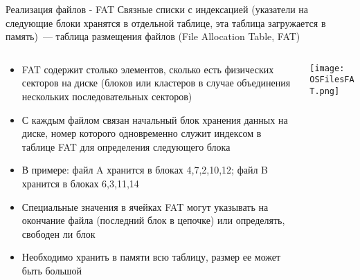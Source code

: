 \documentclass[aspectratio=169,14pt]{beamer}
\begin{document}
\begin{frame}{Реализация файлов - FAT}
    \footnotesize{Связные списки с индексацией (указатели на следующие блоки
    хранятся в отдельной таблице, эта таблица загружается в
    память)~--- таблица размещения файлов (File Allocation Table, FAT)}
    \begin{columns}
        \begin{column}{0.6\textwidth}
            \begin{spacing}{0.8}
            \begin{tiny}
                \begin{itemize}
                        \item FAT содержит столько элементов, сколько есть
                        физических секторов на диске (блоков или кластеров
                        в случае объединения нескольких последовательных секторов)
                        \item С каждым файлом связан начальный блок хранения
                        данных на диске, номер которого одновременно служит
                        индексом в таблице FAT для определения следующего блока
                        \item В примере: файл A хранится в блоках 4,7,2,10,12;
                        файл B хранится в блоках 6,3,11,14
                        \item Специальные значения в ячейках FAT могут указывать
                        на окончание файла (последний блок в цепочке) или
                        определять, свободен ли блок
                        \item Необходимо хранить в памяти всю таблицу,
                        размер ее может быть большой
                \end{itemize}
            \end{tiny}
            \end{spacing}
        \end{column}
        \begin{column}{0.4\textwidth}
            \texttt{[image: OSFilesFAT.png]}
        \end{column}
    \end{columns}
\end{frame}
\end{document}
